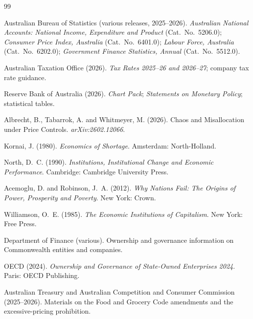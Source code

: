 \documentclass[12pt,anyside]{book}
\theoremstyle{definition}
\theoremstyle{plain}
\theoremstyle{remark}
\begin{document}
\begin{thebibliography}{99}

Australian Bureau of Statistics (various releases, 2025--2026).
\newblock \emph{Australian National Accounts: National Income, Expenditure and Product} (Cat.~No.~5206.0);
\newblock \emph{Consumer Price Index, Australia} (Cat.~No.~6401.0);
\newblock \emph{Labour Force, Australia} (Cat.~No.~6202.0);
\newblock \emph{Government Finance Statistics, Annual} (Cat.~No.~5512.0).

Australian Taxation Office (2026).
\newblock \emph{Tax Rates 2025--26 and 2026--27}; company tax rate guidance.

Reserve Bank of Australia (2026).
\newblock \emph{Chart Pack}; \emph{Statements on Monetary Policy}; statistical tables.

Albrecht, B., Tabarrok, A. and Whitmeyer, M. (2026).
\newblock Chaos and Misallocation under Price Controls.
\newblock \emph{arXiv:2602.12066}.

Kornai, J. (1980).
\newblock \emph{Economics of Shortage}.
\newblock Amsterdam: North-Holland.

North, D.~C. (1990).
\newblock \emph{Institutions, Institutional Change and Economic Performance}.
\newblock Cambridge: Cambridge University Press.

Acemoglu, D. and Robinson, J.~A. (2012).
\newblock \emph{Why Nations Fail: The Origins of Power, Prosperity and Poverty}.
\newblock New York: Crown.

Williamson, O.~E. (1985).
\newblock \emph{The Economic Institutions of Capitalism}.
\newblock New York: Free Press.

Department of Finance (various).
\newblock Ownership and governance information on Commonwealth entities and companies.

OECD (2024).
\newblock \emph{Ownership and Governance of State-Owned Enterprises 2024}.
\newblock Paris: OECD Publishing.

Australian Treasury and Australian Competition and Consumer Commission (2025--2026).
\newblock Materials on the Food and Grocery Code amendments and the excessive-pricing prohibition.

\end{thebibliography}

\end{document}
